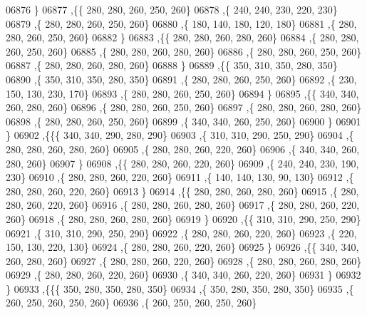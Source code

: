\begin{DoxyCode}
06876     \}
06877    ,\{\{   280,   280,   260,   250,   260\}
06878     ,\{   240,   240,   230,   220,   230\}
06879     ,\{   280,   280,   260,   250,   260\}
06880     ,\{   180,   140,   180,   120,   180\}
06881     ,\{   280,   280,   260,   250,   260\}
06882     \}
06883    ,\{\{   280,   280,   260,   280,   260\}
06884     ,\{   280,   280,   260,   250,   260\}
06885     ,\{   280,   280,   260,   280,   260\}
06886     ,\{   280,   280,   260,   250,   260\}
06887     ,\{   280,   280,   260,   280,   260\}
06888     \}
06889    ,\{\{   350,   310,   350,   280,   350\}
06890     ,\{   350,   310,   350,   280,   350\}
06891     ,\{   280,   280,   260,   250,   260\}
06892     ,\{   230,   150,   130,   230,   170\}
06893     ,\{   280,   280,   260,   250,   260\}
06894     \}
06895    ,\{\{   340,   340,   260,   280,   260\}
06896     ,\{   280,   280,   260,   250,   260\}
06897     ,\{   280,   280,   260,   280,   260\}
06898     ,\{   280,   280,   260,   250,   260\}
06899     ,\{   340,   340,   260,   250,   260\}
06900     \}
06901    \}
06902   ,\{\{\{   340,   340,   290,   280,   290\}
06903     ,\{   310,   310,   290,   250,   290\}
06904     ,\{   280,   280,   260,   280,   260\}
06905     ,\{   280,   280,   260,   220,   260\}
06906     ,\{   340,   340,   260,   280,   260\}
06907     \}
06908    ,\{\{   280,   280,   260,   220,   260\}
06909     ,\{   240,   240,   230,   190,   230\}
06910     ,\{   280,   280,   260,   220,   260\}
06911     ,\{   140,   140,   130,    90,   130\}
06912     ,\{   280,   280,   260,   220,   260\}
06913     \}
06914    ,\{\{   280,   280,   260,   280,   260\}
06915     ,\{   280,   280,   260,   220,   260\}
06916     ,\{   280,   280,   260,   280,   260\}
06917     ,\{   280,   280,   260,   220,   260\}
06918     ,\{   280,   280,   260,   280,   260\}
06919     \}
06920    ,\{\{   310,   310,   290,   250,   290\}
06921     ,\{   310,   310,   290,   250,   290\}
06922     ,\{   280,   280,   260,   220,   260\}
06923     ,\{   220,   150,   130,   220,   130\}
06924     ,\{   280,   280,   260,   220,   260\}
06925     \}
06926    ,\{\{   340,   340,   260,   280,   260\}
06927     ,\{   280,   280,   260,   220,   260\}
06928     ,\{   280,   280,   260,   280,   260\}
06929     ,\{   280,   280,   260,   220,   260\}
06930     ,\{   340,   340,   260,   220,   260\}
06931     \}
06932    \}
06933   ,\{\{\{   350,   280,   350,   280,   350\}
06934     ,\{   350,   280,   350,   280,   350\}
06935     ,\{   260,   250,   260,   250,   260\}
06936     ,\{   260,   250,   260,   250,   260\}

\end{DoxyCode}
